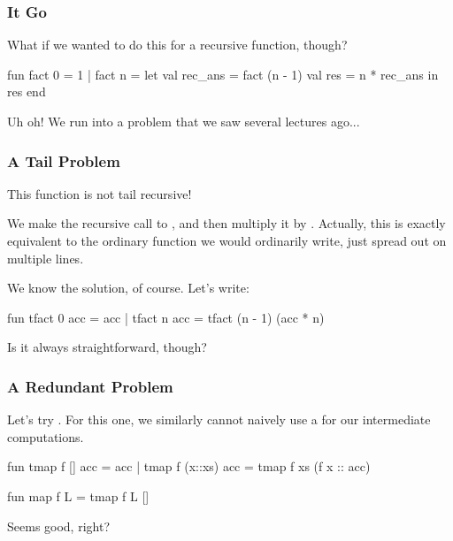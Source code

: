 \documentclass[aspectratio=169]{beamer}
\begin{document}
\begin{frame}[fragile]
  \frametitle{ It Go}

  What if we wanted to do this for a recursive function, though?

  \pause
  \vspace{\fill}

  \begin{codeblock}
    fun fact 0 = 1
      | fact n =
        let
          val rec_ans = fact (n - 1)
          val res = n * rec_ans
        in
          res
        end
  \end{codeblock}

  \pause
  \vspace{\fill}

  Uh oh! We run into a problem that we saw several lectures ago...
\end{frame}

\begin{frame}[fragile]
  \frametitle{A Tail Problem}

  This function is not tail recursive!

  \pause
  \vspace{\fill}

  We make the recursive call to , and then multiply it by
  . Actually, this is exactly equivalent to the ordinary 
  function we would ordinarily write, just spread out on multiple lines.

  \pause
  \vspace{\fill}

  We know the solution, of course. Let's write:
  \begin{codeblock}
    fun tfact 0 acc = acc
      | tfact n acc = tfact (n - 1) (acc * n)
  \end{codeblock}

  \pause
  \vspace{\fill}

  Is it always straightforward, though?
\end{frame}

\begin{frame}[fragile]
  \frametitle{A Redundant Problem}

  Let's try . For this one, we similarly cannot
  naively use a  for our intermediate computations.

  \pause
  \vspace{\fill}

  \begin{codeblock}
    fun tmap f [] acc = acc
      | tmap f (x::xs) acc = tmap f xs (f x :: acc)

    fun map f L = tmap f L []
  \end{codeblock}

  Seems good, right?

  \pause
  \vspace{\fill}

\end{frame}
\end{document}
